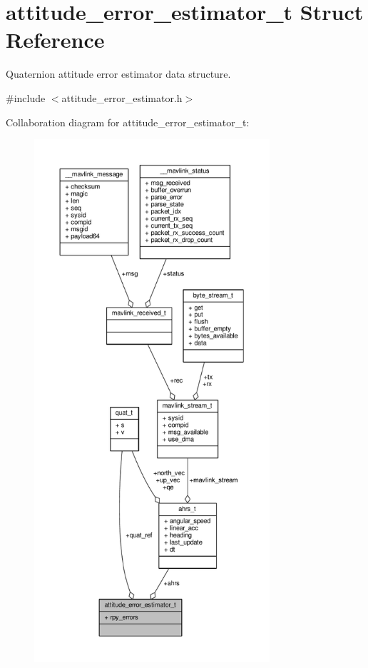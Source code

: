 \hypertarget{structattitude__error__estimator__t}{\section{attitude\+\_\+error\+\_\+estimator\+\_\+t Struct Reference}
\label{structattitude__error__estimator__t}
}


Quaternion attitude error estimator data structure.  




{\ttfamily \#include $<$attitude\+\_\+error\+\_\+estimator.\+h$>$}



Collaboration diagram for attitude\+\_\+error\+\_\+estimator\+\_\+t\+:
\nopagebreak
\begin{figure}[H]
\begin{center}
\leavevmode
\includegraphics[height=550pt]{structattitude__error__estimator__t__coll__graph}
\end{center}
\end{figure}
